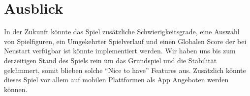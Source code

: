 \chapter{Ausblick}
In der Zukunft könnte das Spiel zusätzliche Schwierigkeitsgrade, eine Auswahl von Spielfiguren, ein Umgekehrter Spielverlauf und einen Globalen Score der bei Neustart verfügbar ist könnte implementiert werden. Wir haben uns bis zum derzeitigen Stand des Spiels rein um das Grundspiel und die Stabilität gekümmert, somit blieben solche ``Nice to have'' Features aus. Zusätzlich könnte dieses Spiel vor allem auf mobilen Plattformen als App Angeboten werden können.